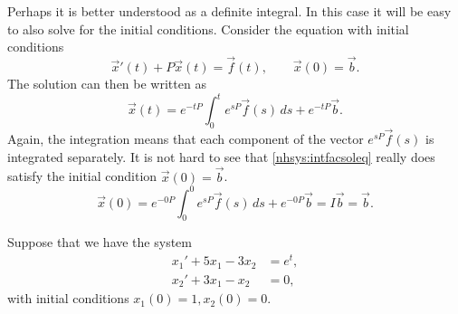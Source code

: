 \documentclass{ximera}
\begin{document}
Perhaps it is better understood as a definite integral.  In this case it will be easy to also solve for the initial conditions. Consider the equation with initial conditions
\begin{equation*}
    {\vec{x}}'(t) + P\vec{x}(t) = \vec{f}(t) , \qquad \vec{x}(0) = \vec{b} .
\end{equation*}
The solution can then be written as
\begin{equation} \label{nhsys:intfacsoleq}
    \vec{x}(t) = e^{-tP} \int_0^t e^{sP}\vec{f}(s) \, ds + e^{-tP} \vec{b} .
\end{equation}
Again, the integration means that each component of the vector  $e^{sP}\vec{f}(s)$ is integrated separately. It is not hard to see that \eqref{nhsys:intfacsoleq} really does satisfy the initial condition $\vec{x}(0) = \vec{b}$.
\begin{equation*}
    \vec{x}(0) = e^{-0P} \int_0^0 e^{sP}\vec{f}(s) \, ds + e^{-0P} \vec{b} = I \vec{b} = \vec{b} .
\end{equation*}

\begin{example}
    Suppose that we have the system
    \begin{align*}
        x_1' + 5x_1 - 3x_2 &= e^t , \\
        x_2' + 3x_1 - x_2 &= 0 ,
    \end{align*}
    with initial conditions $x_1(0) = 1, x_2(0) = 0$.
\end{example}
\end{document}
